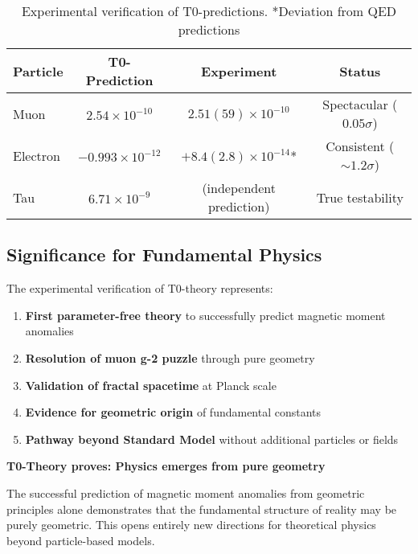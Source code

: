 \documentclass[12pt,a4paper]{article}
\numberwithin{equation}{section}
\begin{document}
	\begin{table}[h]
		\centering
		\begin{tabular}{lccc}
			\toprule
			\textbf{Particle} & \textbf{T0-Prediction} & \textbf{Experiment} & \textbf{Status} \\
			\midrule
			Muon & $2.54 \times 10^{-10}$ & $2.51(59) \times 10^{-10}$ & Spectacular ($0.05\sigma$) \\
			Electron & $-0.993 \times 10^{-12}$ & $+8.4(2.8) \times 10^{-14}$* & Consistent ($\sim 1.2\sigma$) \\
			Tau & $6.71 \times 10^{-9}$ & (independent prediction) & True testability \\
			\bottomrule
		\end{tabular}
		\caption{Experimental verification of T0-predictions. *Deviation from QED predictions}
		\label{tab:experimental_verification}
	\end{table}
	
	
	\subsection{Significance for Fundamental Physics}
	
	The experimental verification of T0-theory represents:
	
	\begin{enumerate}
		\item \textbf{First parameter-free theory} to successfully predict magnetic moment anomalies
		\item \textbf{Resolution of muon g-2 puzzle} through pure geometry
		\item \textbf{Validation of fractal spacetime} at Planck scale
		\item \textbf{Evidence for geometric origin} of fundamental constants
		\item \textbf{Pathway beyond Standard Model} without additional particles or fields
	\end{enumerate}
	
	\begin{tcolorbox}[title={\textbf{REVOLUTIONARY IMPACT}},colframe=purple,colback=purple!5]
		\textbf{T0-Theory proves: Physics emerges from pure geometry}
		
		The successful prediction of magnetic moment anomalies from geometric principles alone demonstrates that the fundamental structure of reality may be purely geometric. This opens entirely new directions for theoretical physics beyond particle-based models.
	\end{tcolorbox}
	
\end{document}
